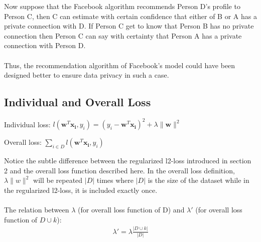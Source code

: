 \documentclass[12pt]{article}
\begin{document}
    Now suppose that the Facebook algorithm recommends Person D's profile to Person C, then C can estimate with certain confidence that either of B or A has a private connection with D. If Person C get to know that Person B has no private connection then Person C can say with certainty that Person A has a private connection with Person D. \\
    \\
    Thus, the recommendation algorithm of Facebook's model could have been designed better to ensure data privacy in such a case.

\subsection{Individual and Overall Loss}
\begin{definition}
Individual loss: $l(\boldsymbol{w}^T\boldsymbol{x_i},y_i) = (y_i - \boldsymbol{w}^T\boldsymbol{x_i})^2 + \lambda \|\boldsymbol{w}\|^2$
\end{definition}
\begin{definition}
Overall loss: $\sum_{i\in D} l(\boldsymbol{w}^T\boldsymbol{x_i},y_i) $ 
\end{definition}
\noindent Notice the subtle difference between the regularized l2-loss introduced in section 2 and the overall loss function described here. In the overall loss definition, $\lambda\|w\|^2$ will be repeated $|D|$ times where $|D|$ is the size of the dataset while in the regularized l2-loss, it is included exactly once.\\
\\
The relation between $\lambda$ (for overall loss function of D) and $\lambda'$ (for overall loss function of $D \cup k$):
\begin{align}
    \lambda' = \lambda\frac{|D \cup k|}{|D|} \nonumber
\end{align}
\end{document}
